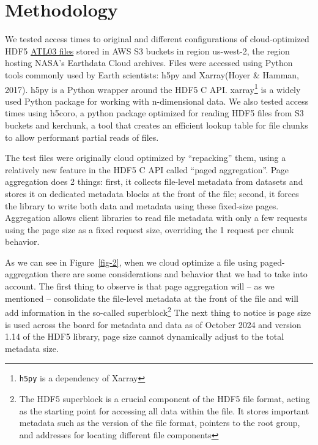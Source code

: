 \documentclass[
]{agujournal2019}
\makeatletter
\newcommand*\pandocbounded[1]{%
  \sbox\pandoc@box{#1}%
  \Gscale@div\@tempa{\textheight}{\dimexpr\ht\pandoc@box+\dp\pandoc@box\relax}%
  \Gscale@div\@tempb{\linewidth}{\wd\pandoc@box}%
  \ifdim\@tempb\p@<\@tempa\p@\let\@tempa\@tempb\fi%
  \ifdim\@tempa\p@<\p@\scalebox{\@tempa}{\usebox\pandoc@box}%
  \else\usebox{\pandoc@box}%
  \fi%
}
\makeatother
\begin{document}
\section{Methodology}\label{methodology}

We tested access times to original and different configurations of
cloud-optimized HDF5
\href{https://its-live-data.s3.amazonaws.com/index.html\#test-space/cloud-experiments/h5cloud/}{ATL03
files} stored in AWS S3 buckets in region us-west-2, the region hosting
NASA's Earthdata Cloud archives. Files were accessed using Python tools
commonly used by Earth scientists: h5py and Xarray(Hoyer \& Hamman,
2017). h5py is a Python wrapper around the HDF5 C API. xarray\footnote{\texttt{h5py}
  is a dependency of Xarray} is a widely used Python package for working
with n-dimensional data. We also tested access times using h5coro, a
python package optimized for reading HDF5 files from S3 buckets and
kerchunk, a tool that creates an efficient lookup table for file chunks
to allow performant partial reads of files.

The test files were originally cloud optimized by ``repacking'' them,
using a relatively new feature in the HDF5 C API called ``paged
aggregation''. Page aggregation does 2 things: first, it collects
file-level metadata from datasets and stores it on dedicated metadata
blocks at the front of the file; second, it forces the library to write
both data and metadata using these fixed-size pages. Aggregation allows
client libraries to read file metadata with only a few requests using
the page size as a fixed request size, overriding the 1 request per
chunk behavior.

\begin{figure*}

\centering{

\pandocbounded{\texttt{[image: figures/figure-2.png]}}

}

\caption{\label{fig-2}shows how file-level metadata and data gets
internally packed once we use paged aggregation on a file.}

\end{figure*}%

As we can see in Figure~\ref{fig-2}, when we cloud optimize a file using
paged-aggregation there are some considerations and behavior that we had
to take into account. The first thing to observe is that page
aggregation will -- as we mentioned -- consolidate the file-level
metadata at the front of the file and will add information in the
so-called superblock\footnote{The HDF5 superblock is a crucial component
  of the HDF5 file format, acting as the starting point for accessing
  all data within the file. It stores important metadata such as the
  version of the file format, pointers to the root group, and addresses
  for locating different file components} The next thing to notice is
page size is used across the board for metadata and data as of October
2024 and version 1.14 of the HDF5 library, page size cannot dynamically
adjust to the total metadata size.
\end{document}
